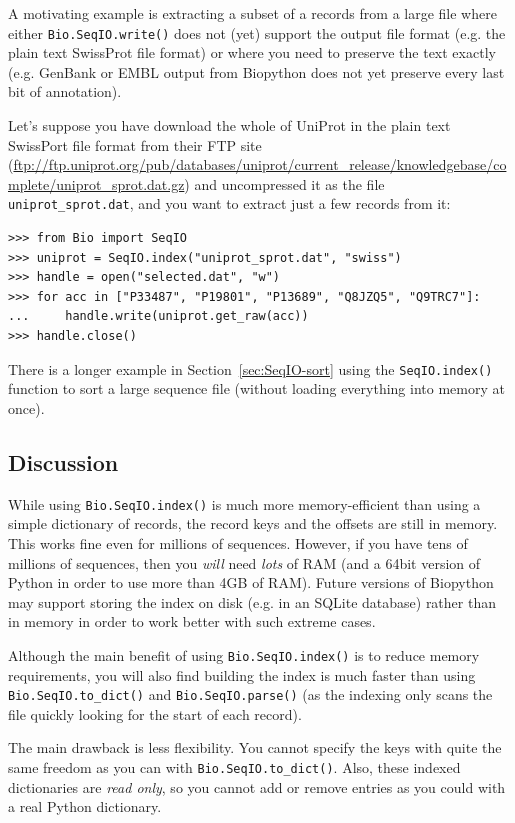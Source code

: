 \documentclass{report}
\begin{document}
A motivating example is extracting a subset of a records from a large
file where either \verb|Bio.SeqIO.write()| does not (yet) support the
output file format (e.g. the plain text SwissProt file format) or
where you need to preserve the text exactly (e.g. GenBank or EMBL
output from Biopython does not yet preserve every last bit of
annotation).

Let's suppose you have download the whole of UniProt in the plain
text SwissPort file format from their FTP site
(\url{ftp://ftp.uniprot.org/pub/databases/uniprot/current_release/knowledgebase/complete/uniprot_sprot.dat.gz})
and uncompressed it as the file \verb|uniprot_sprot.dat|, and you
want to extract just a few records from it:

\begin{verbatim}
>>> from Bio import SeqIO
>>> uniprot = SeqIO.index("uniprot_sprot.dat", "swiss")
>>> handle = open("selected.dat", "w")
>>> for acc in ["P33487", "P19801", "P13689", "Q8JZQ5", "Q9TRC7"]:
...     handle.write(uniprot.get_raw(acc))
>>> handle.close()
\end{verbatim}

There is a longer example in Section~\ref{sec:SeqIO-sort} using the
\verb|SeqIO.index()| function to sort a large sequence file (without
loading everything into memory at once).

\subsection{Discussion}

While using \verb|Bio.SeqIO.index()| is much more memory-efficient than
using a simple dictionary of records, the record keys and the offsets are
still in memory. This works fine even for millions of sequences. However,
if you have tens of millions of sequences, then you \emph{will} need
\emph{lots} of RAM (and a 64bit version of Python in order to use more
than 4GB of RAM). Future versions of Biopython may support storing the
index on disk (e.g. in an SQLite database) rather than in memory in order
to work better with such extreme cases.

Although the main benefit of using \verb|Bio.SeqIO.index()| is to reduce
memory requirements, you will also find building the index is much faster
than using \verb|Bio.SeqIO.to_dict()| and \verb|Bio.SeqIO.parse()| (as the
indexing only scans the file quickly looking for the start of each record).

The main drawback is less flexibility. You cannot specify the keys with quite
the same freedom as you can with \verb|Bio.SeqIO.to_dict()|. Also, these
indexed dictionaries are \emph{read only}, so you cannot add or remove
entries as you could with a real Python dictionary.
\end{document}
